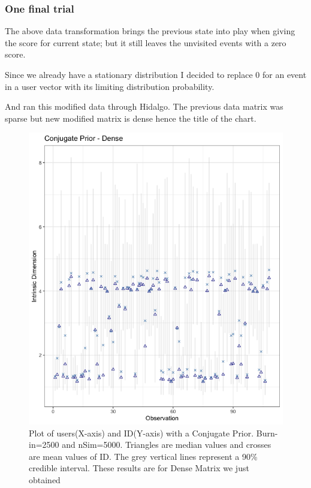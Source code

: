 \documentclass{article}
\begin{document}
\subsubsection{One final trial}
The above data transformation brings the previous state into play when giving the score for current state; but it still leaves the unvisited events with a zero score.

Since we already have a stationary distribution I decided to replace 0 for an event in a user vector with its limiting distribution probability.

And ran this modified data through Hidalgo. The previous data matrix was sparse but new modified matrix is dense hence the title of the chart.

\begin{figure}[H]
  \includegraphics[width=1.3\textwidth]{DenseTransition-ConjugatePrior.png}
  \caption{Plot of users(X-axis) and ID(Y-axis) with a Conjugate Prior. Burn-in=2500 and nSim=5000. Triangles are median values and crosses are mean values of ID. The grey vertical lines represent a 90\% credible interval. These results are for Dense Matrix we just obtained}
\label{fig}
\end{figure}
\end{document}

